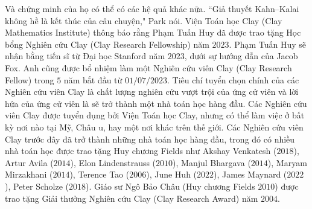 \begin{multicols}{2}
	\vskip 0.1cm
	Và chứng minh của họ có thể có các hệ quả khác nữa. ``Giả thuyết Kahn--Kalai không hề là kết thúc của câu chuyện," Park nói.
	\vskip 0.1cm
	Viện Toán học Clay (Clay Mathematics Institute) thông báo rằng Phạm Tuấn Huy đã được trao tặng Học bổng Nghiên cứu Clay (Clay Research Fellowship) năm $2023$. Phạm Tuấn Huy sẽ nhận bằng tiến sĩ từ Đại học Stanford năm $2023$, dưới sự hướng dẫn của Jacob Fox. Anh cũng được bổ nhiệm làm một Nghiên cứu viên Clay (Clay Research Fellow) trong $5$ năm bắt đầu từ $01/07/2023$.
	\vskip 0.1cm
	Tiêu chí tuyển chọn chính của các Nghiên cứu viên Clay là chất lượng nghiên cứu vượt trội của ứng cử viên và lời hứa của ứng cử viên là sẽ trở thành một nhà toán học hàng đầu. Các Nghiên cứu viên Clay được tuyển dụng bởi Viện Toán học Clay, nhưng có thể làm việc ở bất kỳ nơi nào tại Mỹ, Châu  u, hay một nơi khác trên thế giới.
	\vskip 0.1cm
	Các Nghiên cứu viên Clay trước đây đã trở thành những nhà toán học hàng đầu, trong đó có nhiều nhà toán học được trao tặng Huy chương Fields như Akshay Venkatesh ($2018$), Artur Avila ($2014$), Elon Lindenstrauss ($2010$), Manjul Bhargava ($2014$), Maryam Mirzakhani ($2014$), Terence Tao ($2006$), June Huh ($2022$), James Maynard ($2022$), Peter Scholze ($2018$). Giáo sư Ngô Bảo Châu (Huy chương Fields $2010$) được trao tặng Giải thưởng Nghiên cứu Clay (Clay Research Award) năm $2004$.
\end{multicols}